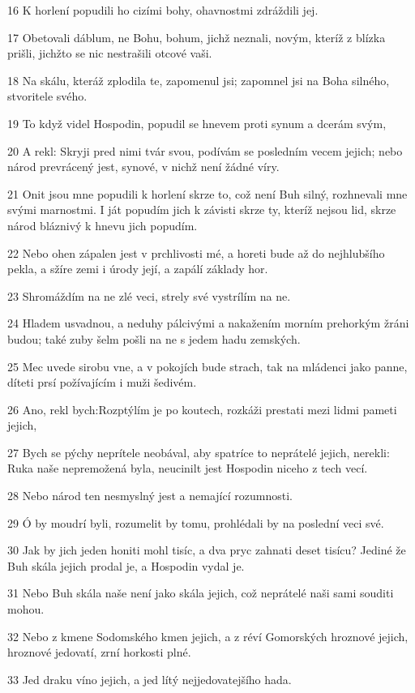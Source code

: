 \par 16 K horlení popudili ho cizími bohy, ohavnostmi zdráždili jej.
\par 17 Obetovali dáblum, ne Bohu, bohum, jichž neznali, novým, kteríž z blízka prišli, jichžto se nic nestrašili otcové vaši.
\par 18 Na skálu, kteráž zplodila te, zapomenul jsi; zapomnel jsi na Boha silného, stvoritele svého.
\par 19 To když videl Hospodin, popudil se hnevem proti synum a dcerám svým,
\par 20 A rekl: Skryji pred nimi tvár svou, podívám se posledním vecem jejich; nebo národ prevrácený jest, synové, v nichž není žádné víry.
\par 21 Onit jsou mne popudili k horlení skrze to, což není Buh silný, rozhnevali mne svými marnostmi. I ját popudím jich k závisti skrze ty, kteríž nejsou lid, skrze národ bláznivý k hnevu jich popudím.
\par 22 Nebo ohen zápalen jest v prchlivosti mé, a horeti bude až do nejhlubšího pekla, a sžíre zemi i úrody její, a zapálí základy hor.
\par 23 Shromáždím na ne zlé veci, strely své vystrílím na ne.
\par 24 Hladem usvadnou, a neduhy pálcivými a nakažením morním prehorkým žráni budou; také zuby šelm pošli na ne s jedem hadu zemských.
\par 25 Mec uvede sirobu vne, a v pokojích bude strach, tak na mládenci jako panne, díteti prsí požívajícím i muži šedivém.
\par 26 Ano, rekl bych:Rozptýlím je po koutech, rozkáži prestati mezi lidmi pameti jejich,
\par 27 Bych se pýchy neprítele neobával, aby spatríce to neprátelé jejich, nerekli: Ruka naše nepremožená byla, neucinilt jest Hospodin niceho z tech vecí.
\par 28 Nebo národ ten nesmyslný jest a nemající rozumnosti.
\par 29 Ó by moudrí byli, rozumelit by tomu, prohlédali by na poslední veci své.
\par 30 Jak by jich jeden honiti mohl tisíc, a dva pryc zahnati deset tisícu? Jediné že Buh skála jejich prodal je, a Hospodin vydal je.
\par 31 Nebo Buh skála naše není jako skála jejich, což neprátelé naši sami souditi mohou.
\par 32 Nebo z kmene Sodomského kmen jejich, a z réví Gomorských hroznové jejich, hroznové jedovatí, zrní horkosti plné.
\par 33 Jed draku víno jejich, a jed lítý nejjedovatejšího hada.
